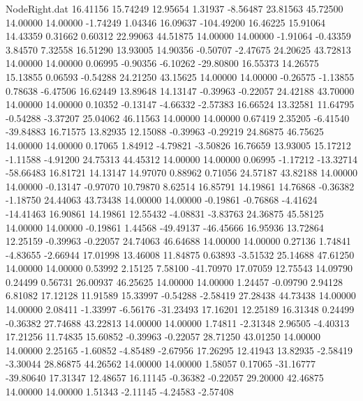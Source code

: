 \begin{filecontents}{NodeRight.dat}
  16.41156   15.74249   12.95654     1.31937   -8.56487   23.81563   45.72500   14.00000   14.00000   -1.74249    1.04346   16.09637 -104.49200
  16.46225   15.91064   14.43359     0.31662    0.60312   22.99063   44.51875   14.00000   14.00000   -1.91064   -0.43359    3.84570    7.32558
  16.51290   13.93005   14.90356    -0.50707   -2.47675   24.20625   43.72813   14.00000   14.00000    0.06995   -0.90356   -6.10262  -29.80800
  16.55373   14.26575   15.13855     0.06593   -0.54288   24.21250   43.15625   14.00000   14.00000   -0.26575   -1.13855    0.78638   -6.47506
  16.62449   13.89648   14.13147    -0.39963   -0.22057   24.42188   43.70000   14.00000   14.00000    0.10352   -0.13147   -4.66332   -2.57383
  16.66524   13.32581   11.64795    -0.54288   -3.37207   25.04062   46.11563   14.00000   14.00000    0.67419    2.35205   -6.41540  -39.84883
  16.71575   13.82935   12.15088    -0.39963   -0.29219   24.86875   46.75625   14.00000   14.00000    0.17065    1.84912   -4.79821   -3.50826
  16.76659   13.93005   15.17212    -1.11588   -4.91200   24.75313   44.45312   14.00000   14.00000    0.06995   -1.17212  -13.32714  -58.66483
  16.81721   14.13147   14.97070     0.88962    0.71056   24.57187   43.82188   14.00000   14.00000   -0.13147   -0.97070   10.79870    8.62514
  16.85791   14.19861   14.76868    -0.36382   -1.18750   24.44063   43.73438   14.00000   14.00000   -0.19861   -0.76868   -4.41624  -14.41463
  16.90861   14.19861   12.55432    -4.08831   -3.83763   24.36875   45.58125   14.00000   14.00000   -0.19861    1.44568  -49.49137  -46.45666
  16.95936   13.72864   12.25159    -0.39963   -0.22057   24.74063   46.64688   14.00000   14.00000    0.27136    1.74841   -4.83655   -2.66944
  17.01998   13.46008   11.84875     0.63893   -3.51532   25.14688   47.61250   14.00000   14.00000    0.53992    2.15125    7.58100  -41.70970
  17.07059   12.75543   14.09790     0.24499    0.56731   26.00937   46.25625   14.00000   14.00000    1.24457   -0.09790    2.94128    6.81082
  17.12128   11.91589   15.33997    -0.54288   -2.58419   27.28438   44.73438   14.00000   14.00000    2.08411   -1.33997   -6.56176  -31.23493
  17.16201   12.25189   16.31348     0.24499   -0.36382   27.74688   43.22813   14.00000   14.00000    1.74811   -2.31348    2.96505   -4.40313
  17.21256   11.74835   15.60852    -0.39963   -0.22057   28.71250   43.01250   14.00000   14.00000    2.25165   -1.60852   -4.85489   -2.67956
  17.26295   12.41943   13.82935    -2.58419   -3.30044   28.86875   44.26562   14.00000   14.00000    1.58057    0.17065  -31.16777  -39.80640
  17.31347   12.48657   16.11145    -0.36382   -0.22057   29.20000   42.46875   14.00000   14.00000    1.51343   -2.11145   -4.24583   -2.57408

\end{filecontents}
